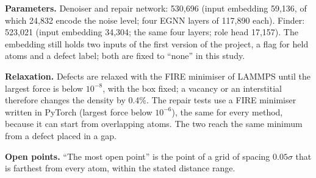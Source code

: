 \documentclass[10pt]{article}
\newif\iffinders
\begin{document}
\textbf{Parameters.} Denoiser and repair network: 530,696 (input embedding 59,136, of which 24,832 encode the noise level; four EGNN layers of 117,890 each). Finder: 523,021 (input embedding 34,304; the same four layers; role head 17,157). The embedding still holds two inputs of the first version of the project, a flag for held atoms and a defect label; both are fixed to ``none'' in this study.

\iffinders
\textbf{The two other finders.} \emph{Transformer} (576,677 parameters): 128 features, four layers with 8 attention heads and a feed-forward part of 256, each normalised before attention. The distance between two atoms (up to $10.5\sigma$, the largest in the box) is expanded in 32 radial basis functions and turned into 64 pair features, from which every layer computes one number per head that is added to the attention weight. The input adds to the species the number of neighbours of each species in 16 radial basis functions up to $2.5\sigma$. \emph{CNN} (498,309 parameters): dots of width $0.15\sigma$ on $128\times128$ pixels ($0.11\sigma$ per pixel); U-Net with 16, 32, 48, 64 and 96 channels at its five levels, two $3\times3$ convolutions per level with group normalisation and SiLU, and circular padding. The coarsest pixel is $1.8\sigma$ wide, and the network sees about $10\sigma$ around each atom. Both networks and the EGNN control use the settings of the finder (learning rate $2\times10^{-4}$, batches of 16, cut at 1, moving average 0.999) for 20,000 updates. The transformer's learning rate rises linearly over the first 1,000 updates. In the symmetry test the glass is turned by $90^\circ$, shifted by a random vector, or its atoms are renumbered, and we count how often the flagged atom stays the same.

\fi
\textbf{Relaxation.} Defects are relaxed with the FIRE minimiser of LAMMPS until the largest force is below $10^{-8}$, with the box fixed; a vacancy or an interstitial therefore changes the density by 0.4\%. The repair tests use a FIRE minimiser written in PyTorch (largest force below $10^{-6}$), the same for every method, because it can start from overlapping atoms. The two reach the same minimum from a defect placed in a gap.

\textbf{Open points.} ``The most open point'' is the point of a grid of spacing $0.05\sigma$ that is farthest from every atom, within the stated distance range.
\end{document}
